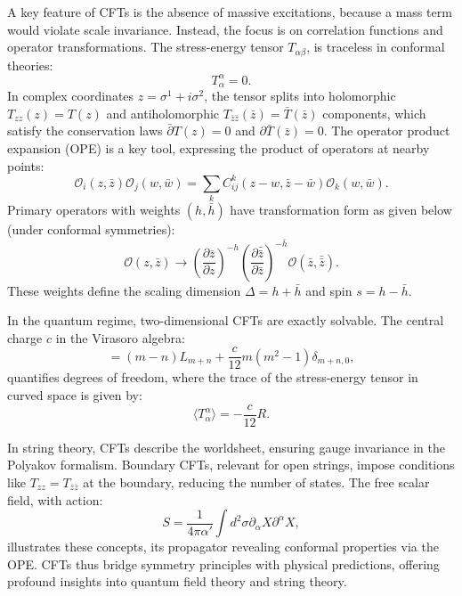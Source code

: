 A key feature of CFTs is the absence of massive excitations, because a mass term would violate scale invariance. Instead, the focus is on correlation functions and operator transformations. The stress-energy tensor $T_{\alpha\beta}$, is traceless in conformal theories:
\begin{equation}
T^\alpha_\alpha = 0.
\end{equation}
In complex coordinates $z = \sigma^1 + i\sigma^2$, the tensor splits into holomorphic $T_{zz}(z) = T(z)$ and antiholomorphic $T_{\bar{z}\bar{z}}(\bar{z}) = \bar{T}(\bar{z})$ components, which satisfy the conservation laws $\bar{\partial} T(z) = 0$ and $\partial \bar{T}(\bar{z}) = 0$. The operator product expansion (OPE) is a key tool, expressing the product of operators at nearby points:
\begin{equation}
\mathcal{O}_i(z, \bar{z}) \mathcal{O}_j(w, \bar{w}) = \sum_k C_{ij}^k(z-w, \bar{z}-\bar{w}) \mathcal{O}_k(w, \bar{w}).
\end{equation}
Primary operators with weights $(h, \bar{h})$ have transformation form as given below (under conformal symmetries):
\begin{equation}
\mathcal{O}(z, \bar{z}) \to \left(\frac{\partial \bar{z}}{\partial z}\right)^{-h} \left(\frac{\partial \bar{\bar{z}}}{\partial \bar{z}}\right)^{-\bar{h}} \mathcal{O}(\bar{z}, \bar{\bar{z}}).
\end{equation}
These weights define the scaling dimension $\Delta = h + \bar{h}$ and spin $s = h - \bar{h}$.

In the quantum regime, two-dimensional CFTs are exactly solvable. The central charge $c$ in the Virasoro algebra:
\begin{equation}
[L_m, L_n] = (m-n)L_{m+n} + \frac{c}{12}m(m^2-1)\delta_{m+n,0},
\end{equation}
quantifies degrees of freedom, where the trace of the stress-energy tensor in curved space is given by:
\begin{equation}
\langle T^\alpha_\alpha \rangle = -\frac{c}{12} R.
\end{equation}

In string theory, CFTs describe the worldsheet, ensuring gauge invariance in the Polyakov formalism. Boundary CFTs, relevant for open strings, impose conditions like $T_{zz} = T_{\bar{z}\bar{z}}$ at the boundary, reducing the number of states. The free scalar field, with action:
\begin{equation}
S = \frac{1}{4\pi\alpha'} \int d^2\sigma \partial_\alpha X \partial^\alpha X,
\end{equation}
illustrates these concepts, its propagator revealing conformal properties via the OPE. CFTs thus bridge symmetry principles with physical predictions, offering profound insights into quantum field theory and string theory.


